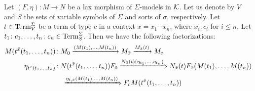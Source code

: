 \begin{lemma}\label{lem:substitution_evaluated}
   Let $(F,\eta) \colon M \to N$ be a lax morphism of $\Sigma$-models in $\mathcal{K}$. Let us denote by $V$ and $S$ the sets of variable symbols of $\Sigma$ and sorts of $\sigma$, respectively. Let $t\in \mathrm{Term}_V^\Sigma$ be a term of type $c$ in a context $\bar{x} = x_1\cdots x_n$, where $x_i\colon c_i$ for $i\leq n$. Let $t_1\colon c_1,\ldots, t_n\colon c_n\in \mathrm{Term}_S^\Sigma$. Then we have the following factorizations:
   \begin{align}
           M(t^{\bar{x}}(t_1,\ldots, t_n)) &\colon M_0\xrightarrow{(M(t_1),\ldots, M(t_n))}M_{\bar{x}}\xrightarrow{M_{\bar{x}}(t)} M_c\label{eq:0}\\
           \eta_{t^{\bar{x}}(t_1,\ldots, t_n)} &\colon N(t^{\bar{x}}(t_1,\ldots,t_n))F_0\xRightarrow{ N_{\bar{x}}(t)(\eta_{t_1},\ldots, \eta_{t_n})}N_{\bar{x}}(t)F_{\bar{x}}(M(t_1),\ldots, M(t_n))
           \nonumber\\
           &\quad \xRightarrow{\eta_{t,\bar{x}}(M(t_1),\ldots, M(t_n))}F_cM(t^{\bar{x}}(t_1,\ldots, t_n))\label{eq:1}
   \end{align}
\end{lemma}
